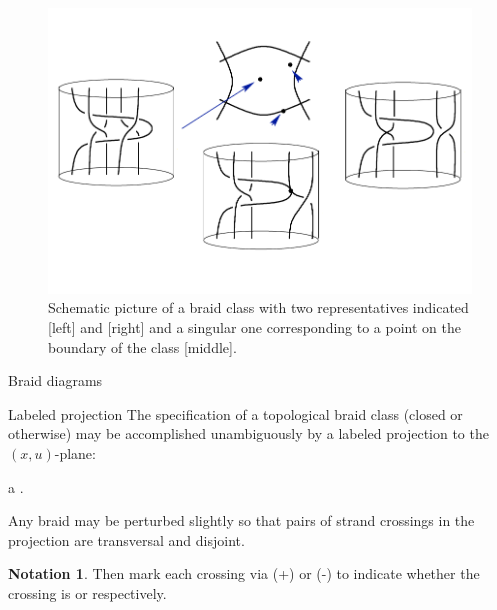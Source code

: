 \documentclass[9pt, english]{beamer}
\theoremstyle{definition}
\newtheorem{notation}[thm]{Notation}
\begin{document}
\begin{frame}
\begin{figure}\label{fig:singular}
        \includegraphics[height=0.7\textheight]{images/Fig18Wojcik.pdf}\caption{Schematic picture of a braid class with two representatives indicated
        [left] and [right] and a singular one corresponding to a point on the boundary of the class [middle].}
        \end{figure}
\end{frame}
\begin{frame}{Braid diagrams }
    \begin{block}{Labeled projection}\pause
        The specification of a topological braid class \pause (closed or
        otherwise) may be accomplished unambiguously by a labeled
        projection to the $(x,u)$-plane:

        a .\pause

        Any braid may be perturbed slightly so that pairs of strand
        crossings in the projection are transversal and disjoint.\pause
    \end{block}
        \begin{notation}
        Then mark each crossing via (+) or (-) to indicate whether the
        crossing is  or 
        respectively.\pause

        \end{notation}
\end{frame}
\end{document}
